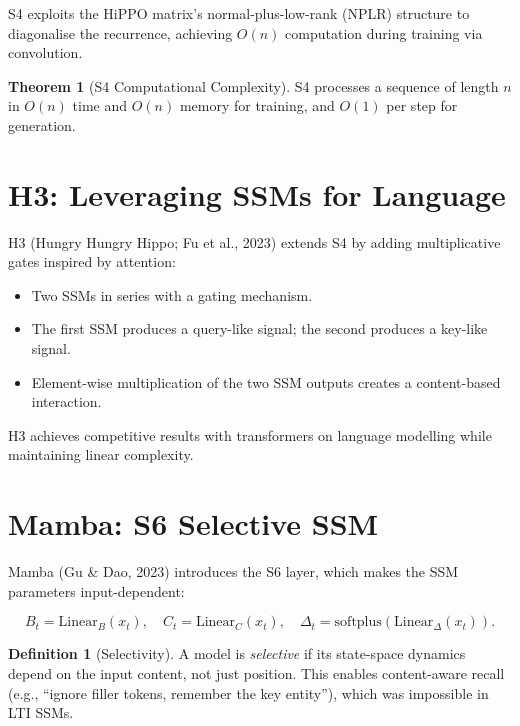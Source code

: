 \documentclass[11pt,a4paper]{book}
\theoremstyle{definition}
\newtheorem{definition}{Definition}[chapter]
\newtheorem{theorem}{Theorem}[chapter]
\begin{document}
S4 exploits the HiPPO matrix's normal-plus-low-rank (NPLR) structure to diagonalise the recurrence, achieving $O(n)$ computation during training via convolution.

\begin{theorem}[S4 Computational Complexity]
	S4 processes a sequence of length $n$ in $O(n)$ time and $O(n)$ memory for training, and $O(1)$ per step for generation.
\end{theorem}

\section{H3: Leveraging SSMs for Language}

H3 (Hungry Hungry Hippo; Fu et al., 2023) extends S4 by adding multiplicative gates inspired by attention:

\begin{itemize}
	\item Two SSMs in series with a gating mechanism.
	\item The first SSM produces a query-like signal; the second produces a key-like signal.
	\item Element-wise multiplication of the two SSM outputs creates a content-based interaction.
\end{itemize}

H3 achieves competitive results with transformers on language modelling while maintaining linear complexity.

\section{Mamba: S6 Selective SSM}

Mamba (Gu \& Dao, 2023) introduces the S6 layer, which makes the SSM parameters input-dependent:

\begin{equation}
	B_t = \text{Linear}_B(x_t), \quad C_t = \text{Linear}_C(x_t), \quad \Delta_t = \text{softplus}(\text{Linear}_\Delta(x_t)).
\end{equation}

\begin{definition}[Selectivity]
	A model is \emph{selective} if its state-space dynamics depend on the input content, not just position. This enables content-aware recall (e.g., ``ignore filler tokens, remember the key entity''), which was impossible in LTI SSMs.
\end{definition}
\end{document}
